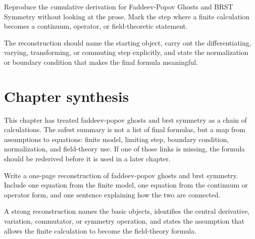 \begin{exercise}
Reproduce the cumulative derivation for Faddeev-Popov Ghosts and BRST Symmetry without looking at the prose.  Mark the step where a finite calculation becomes a continuum, operator, or field-theoretic statement.
\begin{answer}
The reconstruction should name the starting object, carry out the differentiating, varying, transforming, or commuting step explicitly, and state the normalization or boundary condition that makes the final formula meaningful.
\end{answer}
\end{exercise}



\section{Chapter synthesis}

This chapter has treated faddeev-popov ghosts and brst symmetry as a chain of calculations.  The safest summary is not a list of final formulas, but a map from assumptions to equations: finite model, limiting step, boundary condition, normalization, and field-theory use.  If one of those links is missing, the formula should be rederived before it is used in a later chapter.

\begin{exercise}
Write a one-page reconstruction of faddeev-popov ghosts and brst symmetry.  Include one equation from the finite model, one equation from the continuum or operator form, and one sentence explaining how the two are connected.
\begin{answer}
A strong reconstruction names the basic objects, identifies the central derivative, variation, commutator, or symmetry operation, and states the assumption that allows the finite calculation to become the field-theory formula.
\end{answer}
\end{exercise}
